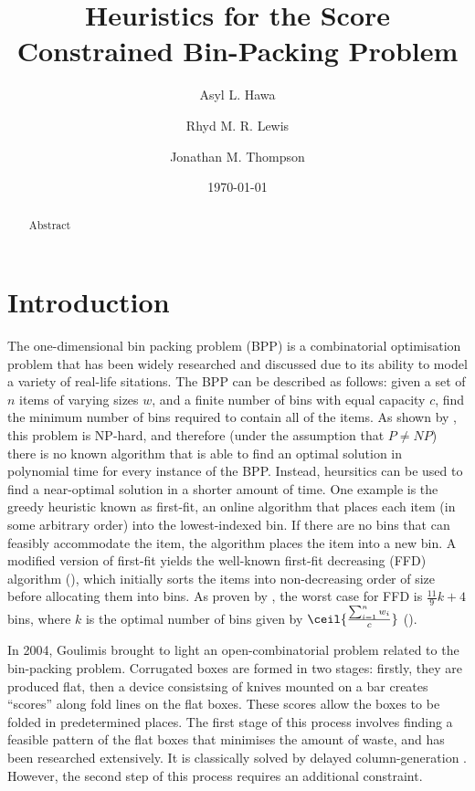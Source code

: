 \documentclass[oribibl]{llncs}
\title{Heuristics for the Score Constrained Bin-Packing Problem}
\author{Asyl L. Hawa \and Rhyd M. R. Lewis \and Jonathan M. Thompson}
\institute{School of Mathematics, Cardiff University, Senghennydd Road, Cardiff, UK, CF24 4AG}
\date{\today}
\begin{document}
\maketitle

\begin{abstract}
	Abstract
\end{abstract}

\section{Introduction}
\label{sec:intro}

The one-dimensional bin packing problem (BPP) is a combinatorial optimisation problem that has been widely researched and discussed due to its ability to model a variety of real-life sitations.
The BPP can be described as follows: given a set of $n$ items of varying sizes $w$, and a finite number of bins with equal capacity $c$, find the minimum number of bins required to contain all of the items. As shown by \cite{garey1979}, this problem is NP-hard, and therefore (under the assumption that $P \neq NP$) there is no known algorithm that is able to find an optimal solution in polynomial time for every instance of the BPP. Instead, heursitics can be used to find a near-optimal solution in a shorter amount of time. One example is the greedy heuristic known as first-fit, an online algorithm that places each item (in some arbitrary order) into the lowest-indexed bin. If there are no bins that can feasibly accommodate the item, the algorithm places the item into a new bin. A modified version of first-fit yields the well-known first-fit decreasing (FFD) algorithm (\cite{eilon1971}), which initially sorts the items into non-decreasing order of size before allocating them into bins. As proven by \cite{dosa2007}, the worst case for FFD is $\frac{11}{9}k + 4$ bins, where $k$ is the optimal number of bins given by $\ceil{\frac{\sum_{i=1}^{n} w_{i}}{c}}$ (\cite{korf2002}).



In 2004, Goulimis brought to light an open-combinatorial problem related to the bin-packing problem. Corrugated boxes are formed in two stages: firstly, they are produced flat, then a device consistsing of knives mounted on a bar creates ``scores'' along fold lines on the flat boxes. These scores allow the boxes to be folded in predetermined places. The first stage of this process involves finding a feasible pattern of the flat boxes that minimises the amount of waste, and has been researched extensively. It is classically solved by delayed column-generation \citep{gilmore1961, gilmore1963}. However, the second step of this process requires an additional constraint.
\end{document}
